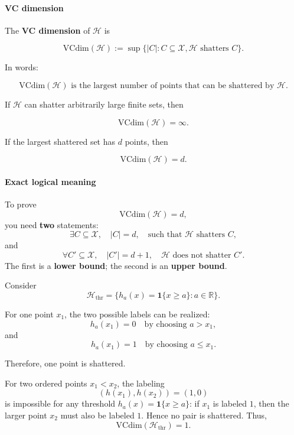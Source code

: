 \documentclass[11pt,a4paper]{article}
\theoremstyle{definition}
\begin{document}
\paragraph{VC dimension}


The \textbf{VC dimension} of $\mathcal{H}$ is

\[
\text{VCdim}(\mathcal{H}) := \sup \{|C| : C \subseteq \mathcal{X}, \mathcal{H} \text{ shatters } C\} .
\]

In words:

\[
\text{VCdim}(\mathcal{H}) \text{ is the largest number of points that can be shattered by } \mathcal{H}.
\]

If $\mathcal{H}$ can shatter arbitrarily large finite sets, then

\[
\text{VCdim}(\mathcal{H}) = \infty.
\]

If the largest shattered set has $d$ points, then

\[
\text{VCdim}(\mathcal{H}) = d.
\]

\paragraph{Exact logical meaning}

To prove
\[
\text{VCdim}(\mathcal{H}) = d,
\]
you need \textbf{two} statements:
\[
\exists C \subseteq \mathcal{X}, \quad |C| = d, \quad \text{such that } \mathcal{H} \text{ shatters } C,
\]
and
\[
\forall C' \subseteq \mathcal{X}, \quad |C'| = d + 1, \quad \mathcal{H} \text{ does not shatter } C'.
\]
The first is a \textbf{lower bound}; the second is an \textbf{upper bound}.

\begin{example}
Consider
\[
\mathcal{H}_{\text{thr}} = \{h_a(x) = \mathbf{1}\{x \geq a\} : a \in \mathbb{R}\}.
\]

For one point $x_1$, the two possible labels can be realized:
\[
h_a(x_1) = 0 \quad \text{by choosing } a > x_1,
\]
and
\[
h_a(x_1) = 1 \quad \text{by choosing } a \leq x_1.
\]

Therefore, one point is shattered.

For two ordered points $x_1 < x_2$, the labeling
\[
(h(x_1), h(x_2)) = (1, 0)
\]
is impossible for any threshold $h_a(x) = \mathbf{1}\{x \geq a\}$: if $x_1$ is labeled $1$, then the larger point $x_2$ must also be labeled $1$. Hence no pair is shattered. Thus,
\[
\text{VCdim}(\mathcal{H}_{\text{thr}}) = 1.
\]

\end{example}
\end{document}
